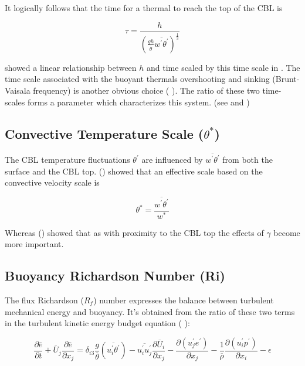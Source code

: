 It logically follows that the time for a thermal to reach the top of the \acs{CBL} is

\begin{equation}
\tau = \frac{h}{\left( \frac{gh}{\overline{\theta}}\overline{w^{'}\theta^{'}} \right)^{\frac{1}{3}}}
\end{equation}

 \citeauthor{SullMoengStev} showed a linear relationship
 between $h$ and time scaled by this time scale in \cite{SullMoengStev}. The time scale
 associated with the buoyant thermals overshooting and sinking (Brunt-Vaisala
frequency) is another obvious choice (\citeauthor{FedConzMir04} \cite{FedConzMir04}).
The ratio of these two time-scales forms a parameter which characterizes this system.
(see \citeauthor{Sorbjan}\cite{Sorbjan} and \citeauthor{Deardorff79} \cite{Deardorff79}) 


\subsection{Convective Temperature Scale ($\theta^{*}$)}
\label{sec:}

The \acs{CBL} temperature fluctuations $\theta^{'}$ are influenced by $\overline{w^{'}\theta^{'}}$ from both the surface and the \acs{CBL} top.
\citeauthor {Deardorff70} (\cite{Deardorff70}) showed that an effective scale based on the convective velocity scale is

\begin{equation}
\theta^{*} = \frac{\overline{w^{'}\theta^{'}}}{w^{*}}
\end{equation} 

Whereas \citeauthor{Sorbjan} (\cite{Sorbjan}) showed that as with proximity to the \acs{CBL} top the effects of $\gamma$ become more important.
 
\subsection{Buoyancy Richardson Number (\acs{Ri})}
\label{sec:}

The flux Richardson ($R_{f}$) number expresses the balance between turbulent mechanical energy and buoyancy.  It's obtained from the ratio of these two terms in the turbulent kinetic energy budget equation (\citeauthor{Stull-BLMetIntro} \cite{Stull-BLMetIntro}):

\begin{equation}
\frac{\partial \overline{e}}{\partial t} + \overline{U}_{j} \frac{\partial \overline{e}}{\partial x_{j}} = \delta_{i3}  \frac{g}{\overline{\theta}} \left( \overline{u_{i}^{'}\theta^{'}} \right) - \overline{u_{i}^{'}u_{j}^{'}}\frac{\partial \overline{U}_{i}}{\partial x_{j}} - \frac{ \partial \left( u_{j}^{'}e^{'} \right)}{\partial x_{j}} - \frac{1}{\overline{\rho}} \frac{\partial \left( u_{i}^{'} p^{'} \right) }{\partial x_{i}} - \epsilon
\end{equation}

